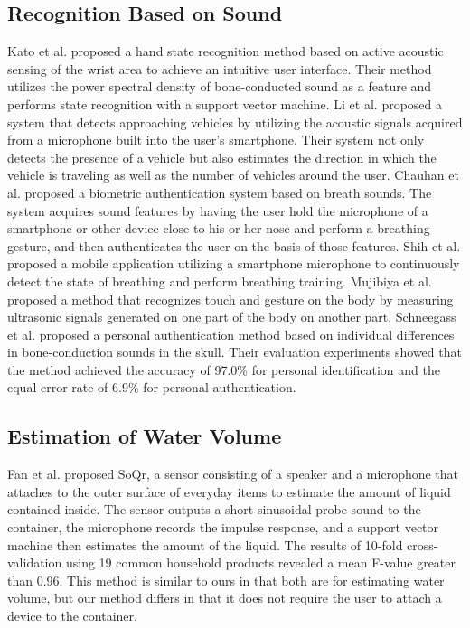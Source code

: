 \documentclass[manuscript,screen,review]{acmart}
\begin{document}
\subsection{Recognition Based on Sound}
Kato et al. \cite{sound_sensing1} proposed a hand state recognition method based on active acoustic sensing of the wrist area to achieve an intuitive user interface. Their method utilizes the power spectral density of bone-conducted sound as a feature and performs state recognition with a support vector machine.
Li et al. \cite{Auto++} proposed a system that detects approaching vehicles by utilizing the acoustic signals acquired from a microphone built into the user's smartphone. Their system not only detects the presence of a vehicle but also estimates the direction in which the vehicle is traveling as well as the number of vehicles around the user.
Chauhan et al. \cite{BreathPrint} proposed a biometric authentication system based on breath sounds. The system acquires sound features by having the user hold the microphone of a smartphone or other device close to his or her nose and perform a breathing gesture, and then authenticates the user on the basis of those features.
Shih et al. \cite{Breeze} proposed a mobile application utilizing a smartphone microphone to continuously detect the state of breathing and perform breathing training.
Mujibiya et al. \cite{sound_sensing2} proposed a method that recognizes touch and gesture on the body by measuring ultrasonic signals generated on one part of the body on another part.
Schneegass et al. \cite{SkullConduct} proposed a personal authentication method based on individual differences in bone-conduction sounds in the skull. Their evaluation experiments showed that the method achieved the accuracy of 97.0\% for personal identification and the equal error rate of 6.9\% for personal authentication.


\subsection{Estimation of Water Volume}
Fan et al. \cite{SoQr} proposed SoQr, a sensor consisting of a speaker and a microphone that attaches to the outer surface of everyday items to estimate the amount of liquid contained inside. The sensor outputs a short sinusoidal probe sound to the container, the microphone records the impulse response, and a support vector machine then estimates the amount of the liquid. The results of 10-fold cross-validation using 19 common household products revealed a mean F-value greater than 0.96.
This method is similar to ours in that both are for estimating water volume, but our method differs in that it does not require the user to attach a device to the container.
\end{document}
